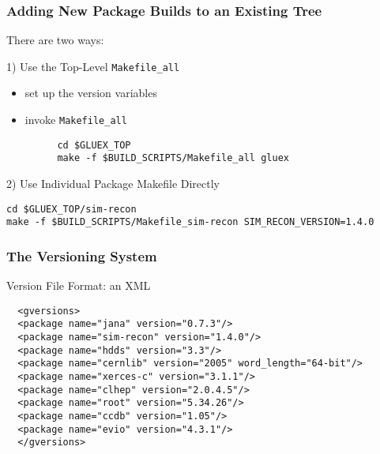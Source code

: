 \documentclass{beamer}
\newcommand{\bi}{\begin{itemize}}
\newcommand{\ei}{\end{itemize}}
\newcommand{\I}{\item}
\begin{document}
\begin{frame}[fragile]
  \frametitle{Adding New Package Builds to an Existing Tree}

There are two ways:

1) Use the Top-Level {\tt Makefile\_all}

\bi
\I set up the version variables
\I invoke {\tt Makefile\_all}
\ei

\begin{verbatim}
         cd $GLUEX_TOP
         make -f $BUILD_SCRIPTS/Makefile_all gluex
\end{verbatim}

2) Use Individual Package Makefile Directly

\begin{verbatim}
cd $GLUEX_TOP/sim-recon
make -f $BUILD_SCRIPTS/Makefile_sim-recon SIM_RECON_VERSION=1.4.0
\end{verbatim}

\end{frame}

\begin{frame}[fragile]
  \frametitle{The Versioning System}

Version File Format: an XML

\begin{verbatim}
  <gversions>
  <package name="jana" version="0.7.3"/>
  <package name="sim-recon" version="1.4.0"/>
  <package name="hdds" version="3.3"/>
  <package name="cernlib" version="2005" word_length="64-bit"/>
  <package name="xerces-c" version="3.1.1"/>
  <package name="clhep" version="2.0.4.5"/>
  <package name="root" version="5.34.26"/>
  <package name="ccdb" version="1.05"/>
  <package name="evio" version="4.3.1"/>
  </gversions>
\end{verbatim}
\end{frame}
\end{document}
